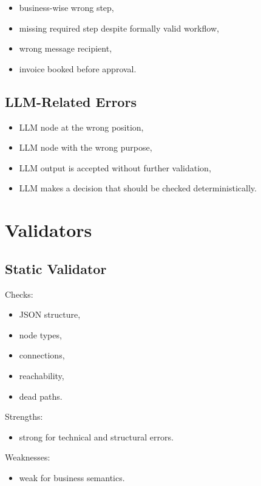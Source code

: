 \documentclass[12pt,a4paper]{article}
\begin{document}
\begin{itemize}
  \item business-wise wrong step,
  \item missing required step despite formally valid workflow,
  \item wrong message recipient,
  \item invoice booked before approval.
\end{itemize}

\subsection{LLM-Related Errors}

\begin{itemize}
  \item LLM node at the wrong position,
  \item LLM node with the wrong purpose,
  \item LLM output is accepted without further validation,
  \item LLM makes a decision that should be checked deterministically.
\end{itemize}

\section{Validators}

\subsection{Static Validator}

Checks:

\begin{itemize}
  \item JSON structure,
  \item node types,
  \item connections,
  \item reachability,
  \item dead paths.
\end{itemize}

Strengths:

\begin{itemize}
  \item strong for technical and structural errors.
\end{itemize}

Weaknesses:

\begin{itemize}
  \item weak for business semantics.
\end{itemize}
\end{document}
